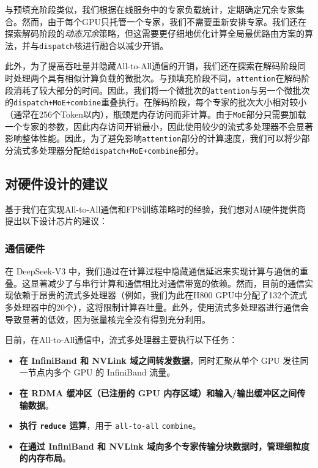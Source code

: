 \documentclass[lang=cn,a4paper,newtx]{elegantpaper}
\newcommand{\dsviii}{DeepSeek-V3}
\begin{document}
与预填充阶段类似，我们根据在线服务中的专家负载统计，定期确定冗余专家集合。然而，由于每个GPU只托管一个专家，我们不需要重新安排专家。我们还在探索解码阶段的\textit{动态冗余}策略，但这需要更仔细地优化计算全局最优路由方案的算法，并与\texttt{dispatch}核进行融合以减少开销。

此外，为了提高吞吐量并隐藏All-to-All通信的开销，我们还在探索在解码阶段同时处理两个具有相似计算负载的微批次。与预填充阶段不同，\texttt{attention}在解码阶段消耗了较大部分的时间。因此，我们将一个微批次的\texttt{attention}与另一个微批次的\texttt{dispatch+MoE+combine}重叠执行。在解码阶段，每个专家的批次大小相对较小（通常在256个Token以内），瓶颈是内存访问而非计算。由于\texttt{MoE}部分只需要加载一个专家的参数，因此内存访问开销最小，因此使用较少的流式多处理器不会显著影响整体性能。因此，为了避免影响\texttt{attention}部分的计算速度，我们可以将少部分流式多处理器分配给\texttt{dispatch+MoE+combine}部分。

\subsection{对硬件设计的建议}
\label{fp8_hardware_design}

基于我们在实现All-to-All通信和FP8训练策略时的经验，我们想对AI硬件提供商提出以下设计芯片的建议：

\subsubsection{通信硬件}

在 \dsviii{} 中，我们通过在计算过程中隐藏通信延迟来实现计算与通信的重叠。这显著减少了与串行计算和通信相比对通信带宽的依赖。然而，目前的通信实现依赖于昂贵的流式多处理器（例如，我们为此在H800 GPU中分配了132个流式多处理器中的20个），这将限制计算吞吐量。此外，使用流式多处理器进行通信会导致显著的低效，因为张量核完全没有得到充分利用。

目前，在All-to-All通信中，流式多处理器主要执行以下任务：

\begin{itemize}[topsep=0pt]
    \item
    \textbf{在 InfiniBand 和 NVLink 域之间转发数据}，同时汇聚从单个 GPU 发往同一节点内多个 GPU 的 InfiniBand 流量。
    \item 
    \textbf{在 RDMA 缓冲区（已注册的 GPU 内存区域）和输入/输出缓冲区之间传输数据}。
    \item 
    \textbf{执行 \texttt{reduce} 运算}，用于 \texttt{all-to-all} \texttt{combine}。
    \item
    \textbf{在通过 InfiniBand 和 NVLink 域向多个专家传输分块数据时，管理细粒度的内存布局}。
\end{itemize}
\end{document}

